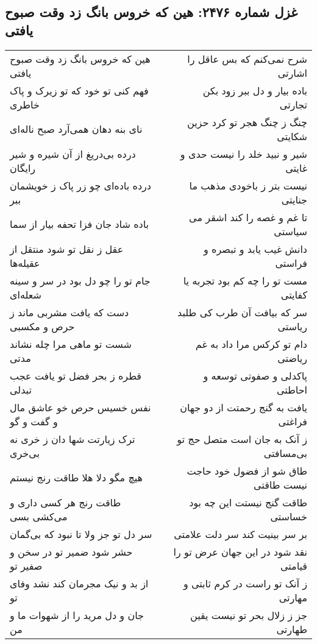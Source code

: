 \begin{center}
\section*{غزل شماره ۲۴۷۶: هین که خروس بانگ زد وقت صبوح یافتی}
\label{sec:2476}
\begin{longtable}{l p{0.5cm} r}
هین که خروس بانگ زد وقت صبوح یافتی
&&
شرح نمی‌کنم که بس عاقل را اشارتی
\\
فهم کنی تو خود که تو زیرک و پاک خاطری
&&
باده بیار و دل ببر زود بکن تجارتی
\\
نای بنه دهان همی‌آرد صبح ناله‌ای
&&
چنگ ز چنگ هجر تو کرد حزین شکایتی
\\
درده بی‌دریغ از آن شیره و شیر رایگان
&&
شیر و نبید خلد را نیست حدی و غایتی
\\
درده باده‌ای چو زر پاک ز خویشمان ببر
&&
نیست بتر ز باخودی مذهب ما جنایتی
\\
باده شاد جان فزا تحفه بیار از سما
&&
تا غم و غصه را کند اشقر می سیاستی
\\
عقل ز نقل تو شود منتقل از عقیله‌ها
&&
دانش غیب یابد و تبصره و فراستی
\\
جام تو را چو دل بود در سر و سینه شعله‌ای
&&
مست تو را چه کم بود تجربه یا کفایتی
\\
دست که یافت مشربی ماند ز حرص و مکسبی
&&
سر که بیافت آن طرب کی طلبد ریاستی
\\
شست تو ماهی مرا چله نشاند مدتی
&&
دام تو کرکس مرا داد به غم ریاضتی
\\
قطره ز بحر فضل تو یافت عجب تبدلی
&&
پاکدلی و صفوتی توسعه و احاطتی
\\
نفس خسیس حرص خو عاشق مال و گفت و گو
&&
یافت به گنج رحمتت از دو جهان فراغتی
\\
ترک زیارتت شها دان ز خری نه بی‌خری
&&
ز آنک به جان است متصل حج تو بی‌مسافتی
\\
هیچ مگو دلا هلا طاقت رنج نیستم
&&
طاق شو از فضول خود حاجت نیست طاقتی
\\
طاقت رنج هر کسی داری و می‌کشی بسی
&&
طاقت گنج نیستت این چه بود خساستی
\\
سر دل تو جز ولا تا نبود که بی‌گمان
&&
بر سر بینیت کند سر دلت علامتی
\\
حشر شود ضمیر تو در سخن و صفیر تو
&&
نقد شود در این جهان عرض تو را قیامتی
\\
از بد و نیک مجرمان کند نشد وفای تو
&&
ز آنک تو راست در کرم ثابتی و مهارتی
\\
جان و دل مرید را از شهوات ما و من
&&
جز ز زلال بحر تو نیست یقین طهارتی
\\

\end{longtable}
\end{center}
